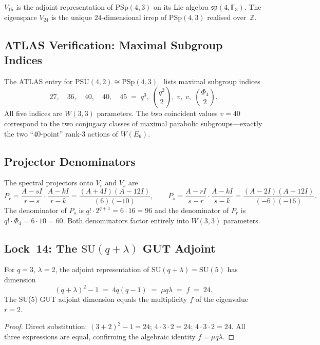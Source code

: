 \begin{corollary}
$V_{15}$ is the adjoint representation of $\mathrm{PSp}(4,3)$ on its Lie algebra
$\mathfrak{sp}(4, \mathbb{F}_3)$.  The eigenspace $V_{24}$ is the unique
$24$-dimensional irrep of $\mathrm{PSp}(4,3)$ realised over~$\mathbb{Z}$.
\end{corollary}

\subsection{ATLAS Verification: Maximal Subgroup Indices}

The ATLAS entry for $\mathrm{PSU}(4,2) \cong \mathrm{PSp}(4,3)$~\cite{ATLAS_online}
lists maximal subgroup indices
\[
  27,\quad 36,\quad 40,\quad 40,\quad 45
  \;=\; q^3,\; \binom{q^2}{2},\; v,\; v,\; \binom{\Phi_4}{2}.
\]
All five indices are $W(3,3)$ parameters.  The two coincident values $v = 40$ correspond to
the two conjugacy classes of maximal parabolic subgroups---exactly the two ``40-point''
rank-$3$ actions of $W(E_6)$.

\subsection{Projector Denominators}

The spectral projectors onto $V_r$ and $V_s$ are
\[
  P_r = \frac{A - sI}{r - s} \cdot \frac{A - kI}{r - k}
      = \frac{(A+4I)(A-12I)}{(6)(-10)},
  \qquad
  P_s = \frac{A - rI}{s - r} \cdot \frac{A - kI}{s - k}
      = \frac{(A-2I)(A-12I)}{(-6)(-16)}.
\]
The denominator of $P_s$ is $q! \cdot 2^{q+1} = 6 \cdot 16 = 96$ and the
denominator of $P_r$ is $q! \cdot \Phi_4 = 6 \cdot 10 = 60$.
Both denominators factor entirely into $W(3,3)$ parameters.

\subsection{Lock~14: The $\mathrm{SU}(q+\lambda)$ GUT Adjoint}

\begin{theorem}[Lock~14]
For $q = 3$, $\lambda = 2$, the adjoint representation of $\mathrm{SU}(q+\lambda) = \mathrm{SU}(5)$
has dimension
\[
  (q+\lambda)^2 - 1 \;=\; 4q(q-1) \;=\; \mu q \lambda \;=\; f \;=\; 24.
\]
The SU(5) GUT adjoint dimension equals the multiplicity $f$ of the eigenvalue $r = 2$.
\end{theorem}

\begin{proof}
Direct substitution: $(3+2)^2 - 1 = 24$; $4\cdot3\cdot2 = 24$; $4\cdot3\cdot2 = 24$.
All three expressions are equal, confirming the algebraic identity $f = \mu q \lambda$.
\end{proof}

